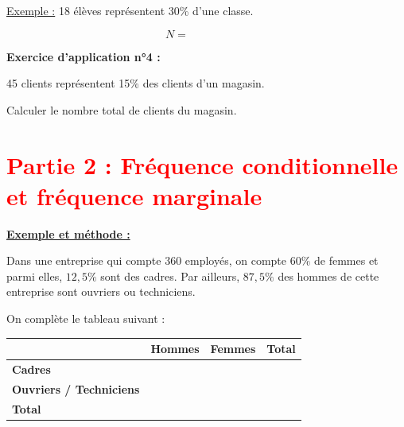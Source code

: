 \documentclass[12pt]{article}
\begin{document}
\vspace{5pt}

\underline{Exemple :}  
18 élèves représentent 30\% d'une classe.

\[
N = \ \ \ \ \ \ \ \ \ \ \ \ \ \ \ \ \ \ \ \ \ \ \ \ 
\]

\vspace{5pt}

\begin{mdframed}[
    linewidth=1pt,
    roundcorner=5pt,
    linecolor=RoyalBlue
]
{\color{RoyalBlue}\textbf{Exercice d'application n°4 :}}
\vspace{5pt}

45 clients représentent 15\% des clients d'un magasin.
\vspace{5pt}

Calculer le nombre total de clients du magasin.
\end{mdframed}

\vspace{20pt}


\section*{\textcolor{red}{Partie 2 : Fréquence conditionnelle et fréquence marginale}}

\vspace{5pt}

\underline{\textbf{Exemple et méthode :}}  
\vspace{5pt}

Dans une entreprise qui compte $360$ employés, on compte $60\%$ de femmes et parmi elles,
$12,5\%$ sont des cadres.
Par ailleurs, $87,5\%$ des hommes de cette entreprise sont ouvriers ou techniciens.

\vspace{5pt}

On complète le tableau suivant :

\begin{center}
    \begin{tabular}{|p{5cm}|p{3cm}|p{3cm}|p{3cm}|}
        \hline
        & \textbf{Hommes} & \rule{0pt}{0.5cm} \textbf{Femmes} & \textbf{Total} \\
        \hline
        \textbf{Cadres} & \rule{0pt}{1cm} &  &  \\
        \hline
        \textbf{Ouvriers / Techniciens} & \rule{0pt}{1cm} &  &  \\
        \hline
        \textbf{Total} & \rule{0pt}{1cm} &  &  \\
        \hline
    \end{tabular}
\end{center}
\end{document}

